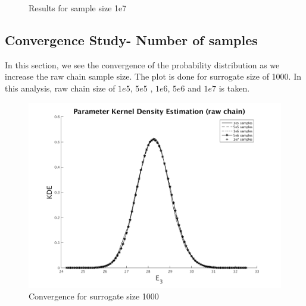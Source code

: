 \begin{figure}[H]
 \ContinuedFloat
\centering
{}
    \caption{Results for sample size 1e7}
\end{figure}

\subsection{Convergence Study- Number of samples }

\noindent In this section, we see the convergence of the probability distribution as we increase the raw chain sample size. The plot is done for surrogate size of 1000. In this analysis, raw chain size of $1e5$, $5e5$ , $1e6$, $5e6$ and $1e7$ is taken. 

\begin{figure}[H]
\centering
\includegraphics[scale = 0.7]{model_1/sample_conv} 
    \caption{Convergence for surrogate size 1000}
\end{figure}



